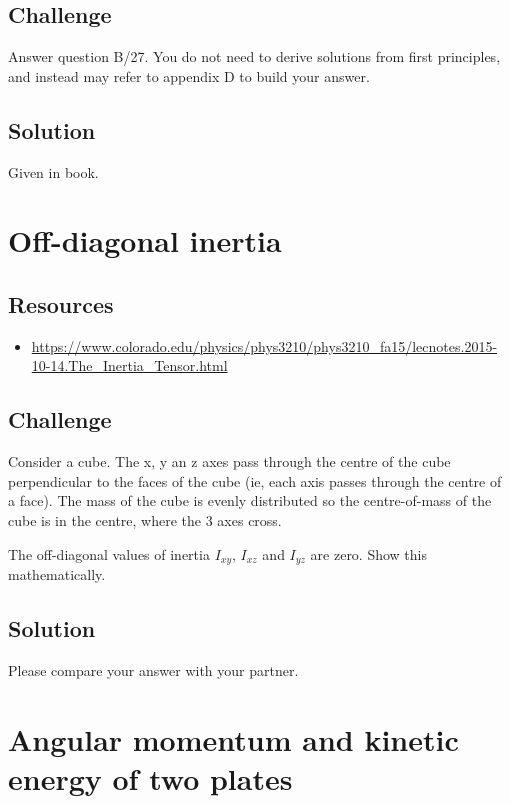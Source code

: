 \subsection*{Challenge}
Answer question B/27. You do not need to derive solutions from first principles, and instead may refer to appendix D to build your answer.

\subsection*{Solution}
Given in book.




\newpage
\section{Off-diagonal inertia}

\subsection*{Resources}
\begin{itemize}
    \item \url{https://www.colorado.edu/physics/phys3210/phys3210_fa15/lecnotes.2015-10-14.The_Inertia_Tensor.html}
\end{itemize}

\subsection*{Challenge}
Consider a cube. The x, y an z axes pass through the centre of the cube perpendicular to the faces of the cube (ie, each axis passes through the centre of a face). The mass of the cube is evenly distributed so the centre-of-mass of the cube is in the centre, where the 3 axes cross.

The off-diagonal values of inertia $I_{xy}$, $I_{xz}$ and $I_{yz}$ are zero. Show this mathematically.

\subsection*{Solution}
Please compare your answer with your partner.




\newpage
\section{Angular momentum and kinetic energy of two plates}

